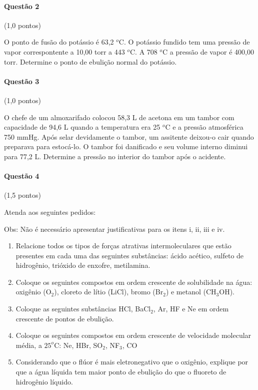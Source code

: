 \documentclass[12pt,a4paper]{article}
\begin{document}
\paragraph{Questão 2} (1,0 pontos)

O ponto de fusão do potássio é 63,2 $^o$C. O potássio fundido tem uma pressão de vapor correspontente a 10,00 torr a 443 $^o$C. A 708 $^o$C a pressão de vapor é 400,00 torr. Determine o ponto de ebulição normal do potássio.

\paragraph{Questão 3} (1,0 pontos)

O chefe de um almoxarifado colocou 58,3 L de acetona em um tambor com capacidade de 94,6 L quando a temperatura era 25 $^o$C e a pressão atmosférica 750 mmHg. Após selar devidamente o tambor, um assitente deixou-o cair quando preparava para estocá-lo. O tambor foi danificado e seu volume interno diminui para 77,2 L. Determine a pressão no interior do tambor após o acidente.

\paragraph{Questão 4} (1,5 pontos)

Atenda aos seguintes pedidos:

Obs: Não é necessário apresentar justificativas para os itens i, ii, iii e iv.

\begin{enumerate}[label=\roman*.]
\item Relacione todos os tipos de forças atrativas intermoleculares que estão presentes em cada uma das seguintes substâncias: ácido acético, sulfeto de hidrogênio, trióxido de enxofre, metilamina. 
\item Coloque os seguintes compostos em ordem crescente de solubilidade na água: oxigênio (O$_2$), cloreto de lítio (LiCl), bromo (Br$_2$) e metanol (CH$_3$OH).
\item Coloque as seguintes substâncias HCl, BaCl$_2$, Ar, HF e Ne em ordem crescente de pontos de ebulição.
\item Coloque os seguintes compostos em ordem crescente de velocidade molecular média, a $25^o$C: Ne, HBr, SO$_2$, NF$_3$, CO
\item Considerando que o flúor é mais eletronegativo que o oxigênio, explique por que a água líquida tem maior ponto de ebulição do que o fluoreto de hidrogênio líquido.
\end{enumerate}
\end{document}
